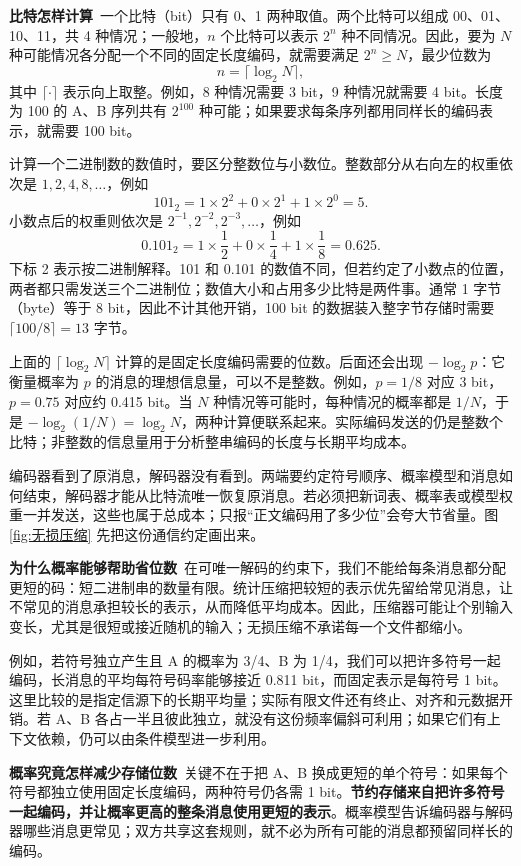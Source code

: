 \textbf{比特怎样计算}~一个比特（bit）只有 0、1 两种取值。两个比特可以组成 00、01、10、11，共 4 种情况；一般地，\(n\) 个比特可以表示 \(2^n\) 种不同情况。因此，要为 \(N\) 种可能情况各分配一个不同的固定长度编码，就需要满足 \(2^n\geq N\)，最少位数为
\[
n=\lceil\log_2 N\rceil,
\]
其中 \(\lceil\cdot\rceil\) 表示向上取整。例如，8 种情况需要 3 bit，9 种情况就需要 4 bit。长度为 100 的 A、B 序列共有 \(2^{100}\) 种可能；如果要求每条序列都用同样长的编码表示，就需要 100 bit。

计算一个二进制数的数值时，要区分整数位与小数位。整数部分从右向左的权重依次是 \(1,2,4,8,\ldots\)，例如
\[
101_2=1\times2^2+0\times2^1+1\times2^0=5.
\]
小数点后的权重则依次是 \(2^{-1},2^{-2},2^{-3},\ldots\)，例如
\[
0.101_2=1\times\frac12+0\times\frac14+1\times\frac18=0.625.
\]
下标 2 表示按二进制解释。101 和 0.101 的数值不同，但若约定了小数点的位置，两者都只需发送三个二进制位；数值大小和占用多少比特是两件事。通常 1 字节（byte）等于 8 bit，因此不计其他开销，100 bit 的数据装入整字节存储时需要 \(\lceil100/8\rceil=13\) 字节。

上面的 \(\lceil\log_2 N\rceil\) 计算的是固定长度编码需要的位数。后面还会出现 \(-\log_2 p\)：它衡量概率为 \(p\) 的消息的理想信息量，可以不是整数。例如，\(p=1/8\) 对应 3 bit，\(p=0.75\) 对应约 0.415 bit。当 \(N\) 种情况等可能时，每种情况的概率都是 \(1/N\)，于是 \(-\log_2(1/N)=\log_2 N\)，两种计算便联系起来。实际编码发送的仍是整数个比特；非整数的信息量用于分析整串编码的长度与长期平均成本。

编码器看到了原消息，解码器没有看到。两端要约定符号顺序、概率模型和消息如何结束，解码器才能从比特流唯一恢复原消息。若必须把新词表、概率表或模型权重一并发送，这些也属于总成本；只报``正文编码用了多少位''会夸大节省量。图 \ref{fig:无损压缩} 先把这份通信约定画出来。

\textbf{为什么概率能够帮助省位数}~在可唯一解码的约束下，我们不能给每条消息都分配更短的码：短二进制串的数量有限。统计压缩把较短的表示优先留给常见消息，让不常见的消息承担较长的表示，从而降低平均成本。因此，压缩器可能让个别输入变长，尤其是很短或接近随机的输入；无损压缩不承诺每一个文件都缩小。

例如，若符号独立产生且 A 的概率为 3/4、B 为 1/4，我们可以把许多符号一起编码，长消息的平均每符号码率能够接近 0.811 bit，而固定表示是每符号 1 bit。这里比较的是指定信源下的长期平均量；实际有限文件还有终止、对齐和元数据开销。若 A、B 各占一半且彼此独立，就没有这份频率偏斜可利用；如果它们有上下文依赖，仍可以由条件模型进一步利用。

\textbf{概率究竟怎样减少存储位数}~关键不在于把 A、B 换成更短的单个符号：如果每个符号都独立使用固定长度编码，两种符号仍各需 1 bit。\textbf{节约存储来自把许多符号一起编码，并让概率更高的整条消息使用更短的表示}。概率模型告诉编码器与解码器哪些消息更常见；双方共享这套规则，就不必为所有可能的消息都预留同样长的编码。

